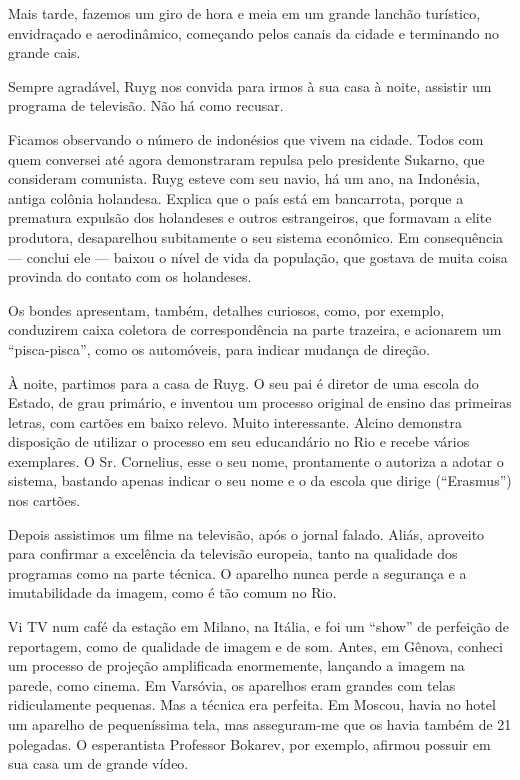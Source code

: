 Mais tarde, fazemos um giro de hora e meia em um grande lanchão turístico, envidraçado e aerodinâmico, começando pelos canais da cidade e terminando no grande cais.

Sempre agradável, Ruyg nos convida para irmos à sua casa à noite, assistir um programa de televisão. Não há como recusar.

Ficamos observando o número de indonésios que vivem na cidade. Todos com quem conversei até agora demonstraram repulsa pelo presidente Sukarno, que consideram comunista. Ruyg esteve com seu navio, há um ano, na Indonésia, antiga colônia holandesa. Explica que o país está em bancarrota, porque a prematura expulsão dos holandeses e outros estrangeiros, que formavam a elite produtora, desaparelhou subitamente o seu sistema econômico. Em consequência --- conclui ele --- baixou o nível de vida da população, que gostava de muita coisa provinda do contato com os holandeses.

Os bondes apresentam, também, detalhes curiosos, como, por exemplo, conduzirem caixa coletora de correspondência na parte trazeira, e acionarem um ``pisca-pisca'', como os automóveis, para indicar mudança de direção.

À noite, partimos para a casa de Ruyg. O seu pai é diretor de uma escola do Estado, de grau primário, e inventou um processo original de ensino das primeiras letras, com cartões em baixo relevo. Muito interessante. Alcino demonstra disposição de utilizar o processo em seu educandário no Rio e recebe vários exemplares. O Sr. Cornelius, esse o seu nome, prontamente o autoriza a adotar o sistema, bastando apenas indicar o seu nome e o da escola que dirige (``Erasmus'') nos cartões.

Depois assistimos um filme na televisão, após o jornal falado. Aliás, aproveito para confirmar a excelência da televisão europeia, tanto na qualidade dos programas como na parte técnica. O aparelho nunca perde a segurança e a imutabilidade da imagem, como é tão comum no Rio.

Vi TV num café da estação em Milano, na Itália, e foi um ``show'' de perfeição de reportagem, como de qualidade de imagem e de som. Antes, em Gênova, conheci um processo de projeção amplificada enormemente, lançando a imagem na parede, como cinema. Em Varsóvia, os aparelhos eram grandes com telas ridiculamente pequenas. Mas a técnica era perfeita. Em Moscou, havia no hotel um aparelho de pequeníssima tela, mas asseguram-me que os havia também de 21 polegadas. O esperantista Professor Bokarev, por exemplo, afirmou possuir em sua casa um de grande vídeo.


